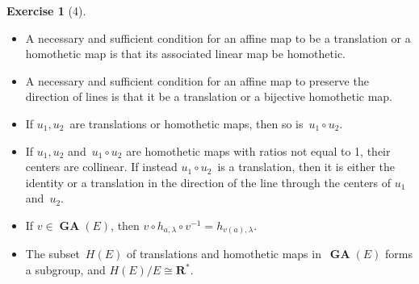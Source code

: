 \documentclass[letterpaper,12pt]{article}
\newcommand{\R}{\mathbf{R}}
\newcommand{\Rnz}{\R^*}
\newcommand{\iso}{\cong}
\newcommand{\after}{\circ}
\DeclareMathOperator{\GA}{\mathbf{GA}}
\newcommand{\inv}[1]{#1^{-1}}
\theoremstyle{definition}
\newtheorem*{exer}{Exercise}
\theoremstyle{remark}
\begin{document}
\goodbreak
\begin{exer}[4]\
\begin{itemize}[itemsep=0pt]
\item A necessary and sufficient condition for an affine map to be a translation or a homothetic map is that its associated linear map be homothetic.
\item A necessary and sufficient condition for an affine map to preserve the direction of lines is that it be a translation or a bijective homothetic map.
\item If \(u_1,u_2\)~are translations or homothetic maps, then so is~\(u_1\after u_2\).
\item If \(u_1,u_2\) and~\(u_1\after u_2\) are homothetic maps with ratios not equal to 1, their centers are collinear. If instead \(u_1\after u_2\)~is a translation, then it is either the identity or a translation in the direction of the line through the centers of \(u_1\) and~\(u_2\).
\item If \(v\in\GA(E)\), then \(v\after h_{a,\lambda}\after\inv{v}=h_{v(a),\lambda}\).
\item The subset~\(H(E)\) of translations and homothetic maps in~\(\GA(E)\) forms a subgroup, and \(H(E)/E\iso\Rnz\).
\end{itemize}
\end{exer}
\end{document}
